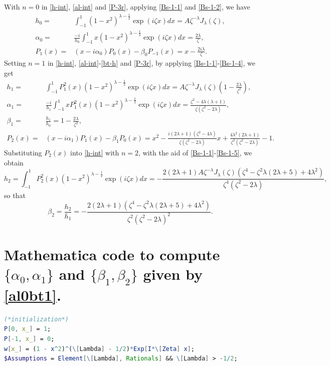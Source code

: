 \documentclass[11pt,a4paper]{article}
\numberwithin{equation}{section}
\begin{document}
{\begin{appendices}
With $n=0$ in \eqref{h-int}, \eqref{al-int} and \eqref{P-3r}, applying \eqref{Bs-1-1} and \eqref{Bs-1-2}, we have
\begin{align*}
h_0=&\int_{-1}^1(1-x^2)^{\lambda-\frac{1}{2}}\exp(\mathit{i}\zeta x)dx=A\zeta^{-\lambda}J_{\lambda}(\zeta),\\
\alpha_0=&\frac{-i}{h_0}\int_{-1}^1x(1-x^2)^{\lambda-\frac{1}{2}}\exp(\mathit{i}\zeta x)dx=\frac{2\lambda}{\zeta},\\
P_1(x)=&(x-i\alpha_{0})P_{0}(x)-\beta_{0}P_{-1}(x)=x-\frac{2 i\lambda}{\zeta}.
\end{align*}
Setting $n=1$ in \eqref{h-int}, \eqref{al-int}-\eqref{bt-h} and \eqref{P-3r}, by applying \eqref{Bs-1-1}-\eqref{Bs-1-4}, we get
\begin{align*}
h_1=&\int_{-1}^1P_1^2(x)(1-x^2)^{\lambda-\frac{1}{2}}\exp(\mathit{i}\zeta x)dx=A\zeta^{-\lambda}J_{\lambda}(\zeta)\left(1-\frac{2\lambda}{\zeta^2}\right),\\
\alpha_1=&\frac{-i}{h_1}\int_{-1}^1xP_1^2(x)(1-x^2)^{\lambda-\frac{1}{2}}\exp(\mathit{i}\zeta x)dx=\frac{\zeta^2-4\lambda(\lambda+1)}{\zeta(\zeta^2-2\lambda)},\\
\beta_1=&\frac{h_1}{h_0}=1-\frac{2\lambda}{\zeta^2},\\
P_{2}(x)=&(x-i\alpha_{1})P_{1}(x)-\beta_{1}P_{0}(x)=x^2-\frac{i (2\lambda +1) \left(\zeta^2-4 \lambda \right)}{\zeta(\zeta^2-2 \lambda) } x +\frac{4 \lambda ^2 (2 \lambda+1)}{\zeta^2(\zeta^2-2\lambda)}-1.
\end{align*}
Substituting $P_2(x)$ into \eqref{h-int} with $n=2$, with the aid of \eqref{Bs-1-1}-\eqref{Bs-1-5}, we obtain
\[h_2=\int_{-1}^1P_2^2(x)(1-x^2)^{\lambda-\frac{1}{2}}\exp(\mathit{i}\zeta x)dx=-\frac{2(2 \lambda +1) A \zeta ^{-\lambda}J_{\lambda}(\zeta)
   \left(\zeta ^4-\zeta ^2
   \lambda  (2 \lambda +5)+4
   \lambda ^2\right)}{\zeta^4(\zeta
   ^2-2 \lambda) },\]
so that
\[\beta_2=\frac{h_2}{h_1}=-\frac{2 (2 \lambda +1)\left(\zeta ^4-\zeta ^2\lambda  (2 \lambda +5)+4\lambda^2\right)}{\zeta^2\left(\zeta ^2-2\lambda \right)^2}.\]

\section{Mathematica code to compute $\{\alpha_0,\alpha_1\}$ and $\{ \beta_1,\beta_2\}$ given by \eqref{al0bt1}.}\label{IV1-M}
\begin{lstlisting}[language=Mathematica]
(*initialization*)
P[0, x_] = 1;
P[-1, x_] = 0;
w[x_] = (1 - x^2)^(\[Lambda] - 1/2)*Exp[I*\[Zeta] x];
$Assumptions = Element[\[Lambda], Rationals] && \[Lambda] > -1/2;


\end{lstlisting}
\end{appendices}}
\end{document}

